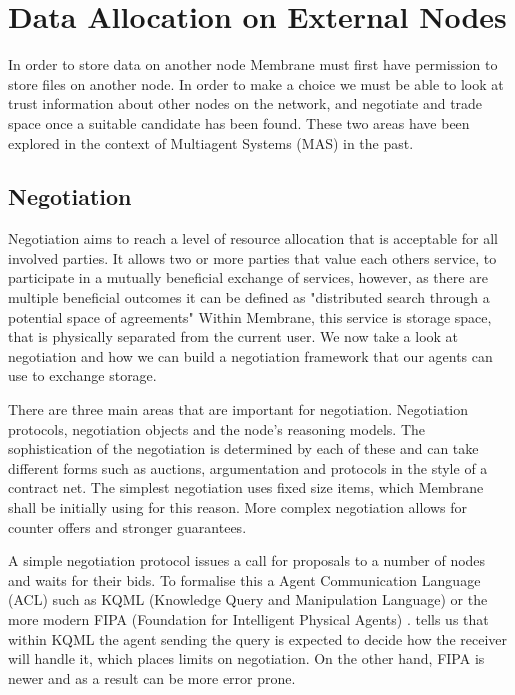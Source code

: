 \documentclass[a4paper, 11pt, twocolumn, twoside]{report}
\begin{document}
\section{Data Allocation on External Nodes}

In order to store data on another node Membrane must first have permission to store files on another node. In order to make a choice we must be able to look at trust information about other nodes on the network, and negotiate and trade space once a suitable candidate has been found. These two areas have been explored in the context of Multiagent Systems (MAS) in the past. \citep{wooldridge2009introduction}

\subsection{Negotiation}

Negotiation aims to reach a level of resource allocation that is acceptable for all involved parties. \citep{rahwan2005interest} It allows two or more parties that value each others service, to participate in a mutually beneficial exchange of services, however, as there are multiple beneficial outcomes it can be defined as "distributed search through a potential space of agreements" \citep{jennings2001automated} Within Membrane, this service is storage space, that is physically separated from the current user. We now take a look at negotiation and how we can build a negotiation framework that our agents can use to exchange storage.

There are three main areas that are important for negotiation. Negotiation protocols, negotiation objects and the node's reasoning models. \citep{beer1999negotiation} The sophistication of the negotiation is determined by each of these and can take different forms such as auctions, argumentation and protocols in the style of a contract net. The simplest negotiation uses fixed size items, which Membrane shall be initially using for this reason. More complex negotiation allows for counter offers and stronger guarantees.

A simple negotiation protocol issues a call for proposals to a number of nodes and waits for their bids. To formalise this a Agent Communication Language (ACL) such as KQML (Knowledge Query and Manipulation Language) \citep{finin1992specification} or the more modern FIPA (Foundation for Intelligent Physical Agents) \citep{fipa2002fipa}. \citep{rahwan2005interest} \cite{beer1999negotiation} tells us that within KQML the agent sending the query is expected to decide how the receiver will handle it, which places limits on negotiation. On the other hand, FIPA is newer and as a result can be more error prone.
\end{document}
